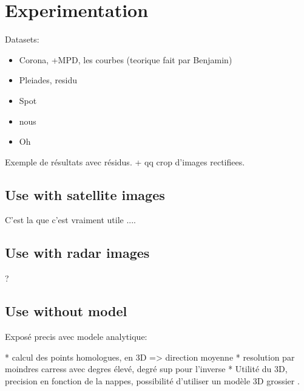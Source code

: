 \documentclass{ipol}
\begin{document}

\section{Experimentation}

Datasets:
\begin{itemize}
\item Corona, +MPD, les courbes (teorique fait par Benjamin)
\item Pleiades, residu 
\item Spot
\end{itemize}

\begin{itemize}
\item nous
\item Oh
\end{itemize}

Exemple de résultats avec résidus. + qq crop d'images rectifiees.

\subsection{Use with satellite images}

C'est la que c'est vraiment utile .... 


\subsection{Use with radar images}

? 


\subsection{Use without model}


Exposé precis avec modele analytique:

    * calcul des points homologues, en 3D => direction moyenne
    * resolution par moindres carress avec degres élevé, degré sup pour l'inverse
    * Utilité du 3D, precision en fonction de la nappes, possibilité d'utiliser un modèle 3D grossier .
\end{document}
